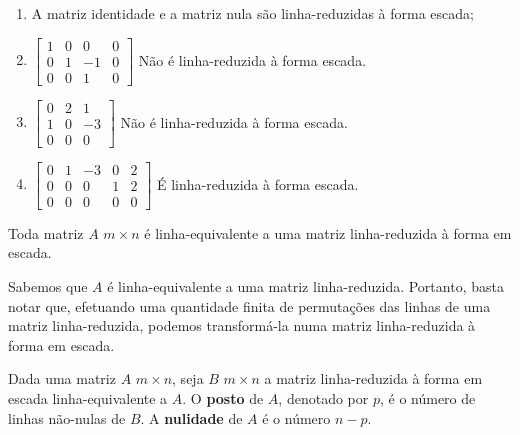 \begin{exemplo}
\begin{enumerate}
	\item  A matriz identidade e a matriz nula s\~ao linha-reduzidas \`a forma escada;
	\item $\begin{bmatrix}
	1 & 0 & 0 & 0\\
	0 & 1 & -1 & 0\\
	0 & 0 & 1 & 0
	\end{bmatrix}$ N\~ao \'e linha-reduzida \`a forma escada.
	\item $\begin{bmatrix}
	0 & 2 & 1\\
	1 & 0 & -3\\
	0 & 0 & 0
	\end{bmatrix}$ N\~ao \'e linha-reduzida \`a forma escada.
	\item $\begin{bmatrix}
	0 & 1 & -3 & 0 & 2\\
	0 & 0 & 0 & 1 & 2\\
	0 & 0 & 0 & 0 & 0
	\end{bmatrix}$ \'E linha-reduzida \`a forma escada.
\end{enumerate}
\end{exemplo}

\begin{teorema}
Toda matriz $A$ $m \times n$ \'e linha-equivalente a uma matriz linha-reduzida \`a forma em escada.
\end{teorema}
\begin{prova}
Sabemos que $A$ \'e linha-equivalente a uma matriz linha-reduzida. Portanto, basta notar que, efetuando uma quantidade finita de permuta\c{c}\~oes das linhas de uma matriz linha-reduzida, podemos transform\'a-la numa matriz linha-reduzida \`a forma em escada.
\end{prova}

\begin{definicao}
Dada uma matriz $A$ $m \times n$, seja $B$ $m \times n$ a matriz linha-reduzida \`a forma em escada linha-equivalente a $A$. O \textbf{posto} de $A$, denotado por $p$, \'e o n\'umero de linhas n\~ao-nulas de $B$. A \textbf{nulidade} de $A$ \'e o n\'umero $n - p$.
\end{definicao}

